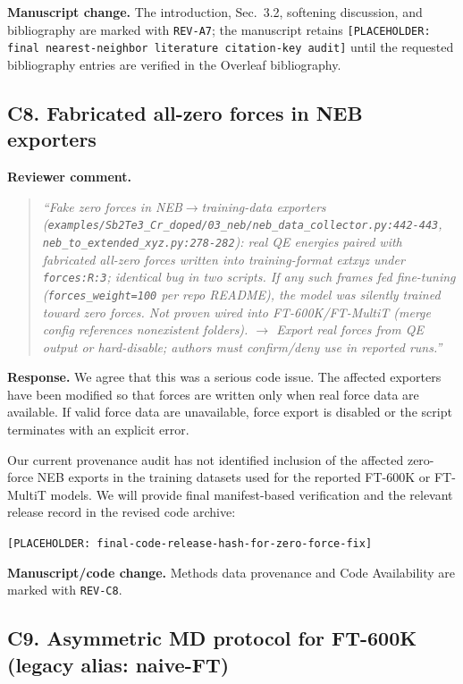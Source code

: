 \documentclass[11pt,a4paper]{article}
\begin{document}
\noindent\textbf{Manuscript change.}
The introduction, Sec.~3.2, softening discussion, and bibliography are marked with \texttt{REV-A7}; the manuscript retains \texttt{[PLACEHOLDER: final nearest-neighbor literature citation-key audit]} until the requested bibliography entries are verified in the Overleaf bibliography.

\subsection*{C8. Fabricated all-zero forces in NEB exporters}

\noindent\textbf{Reviewer comment.}
\begin{quote}
\itshape
``Fake zero forces in NEB$\rightarrow$training-data exporters (\texttt{examples/Sb2Te3\_Cr\_doped/03\_neb/neb\_data\_collector.py:442-443}, \texttt{neb\_to\_extended\_xyz.py:278-282}): real QE energies paired with fabricated all-zero forces written into training-format extxyz under \texttt{forces:R:3}; identical bug in two scripts. If any such frames fed fine-tuning (\texttt{forces\_weight=100} per repo README), the model was silently trained toward zero forces. Not proven wired into FT-600K/FT-MultiT (merge config references nonexistent folders). $\rightarrow$ Export real forces from QE output or hard-disable; authors must confirm/deny use in reported runs.''
\end{quote}

\noindent\textbf{Response.}
We agree that this was a serious code issue. The affected exporters have been modified so that forces are written only when real force data are available. If valid force data are unavailable, force export is disabled or the script terminates with an explicit error.

Our current provenance audit has not identified inclusion of the affected zero-force NEB exports in the training datasets used for the reported FT-600K or FT-MultiT models. We will provide final manifest-based verification and the relevant release record in the revised code archive:

\begin{center}
\texttt{[PLACEHOLDER: final-code-release-hash-for-zero-force-fix]}
\end{center}

\noindent\textbf{Manuscript/code change.}
Methods data provenance and Code Availability are marked with \texttt{REV-C8}.

\subsection*{C9. Asymmetric MD protocol for FT-600K (legacy alias: naive-FT)}
\end{document}

